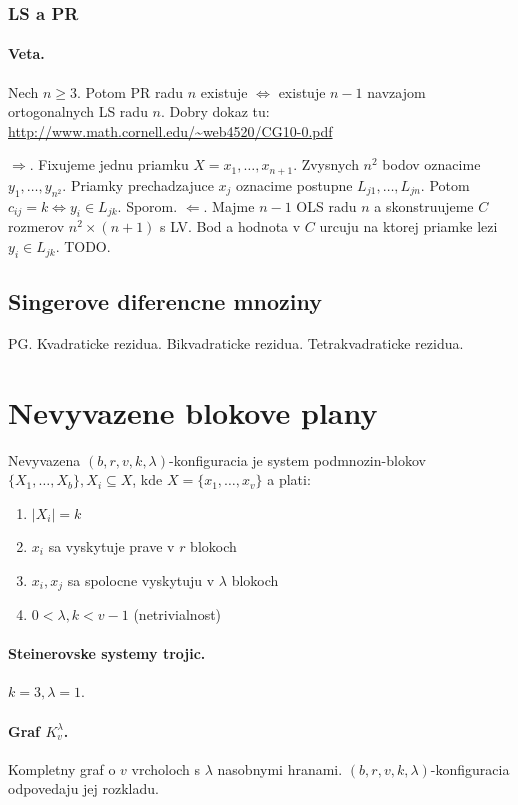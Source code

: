\documentclass[10pt,a4paper]{article}
\begin{document}
\subsubsection{LS a PR}
\paragraph{Veta.}
Nech $n \geq 3$. Potom PR radu $n$ existuje $\Leftrightarrow$ existuje $n-1$ navzajom ortogonalnych LS radu $n$.
Dobry dokaz tu: \url{http://www.math.cornell.edu/~web4520/CG10-0.pdf}

$\Rightarrow$. Fixujeme jednu priamku $X={x_1, \ldots, x_{n+1}}$. Zvysnych $n^2$ bodov oznacime $y_1,\ldots,y_{n^2}$. Priamky prechadzajuce $x_j$ oznacime postupne $L_{j1},\ldots,L_{jn}$. Potom $c_{ij}=k \Leftrightarrow y_i \in L_{jk}$. Sporom. 
$\Leftarrow$. Majme $n-1$ OLS radu $n$ a skonstruujeme $C$ rozmerov $n^2 \times (n+1)$ s LV. Bod a hodnota v $C$ urcuju na ktorej priamke lezi $y_i \in L_{jk}$. 
TODO. 

\subsection{Singerove diferencne mnoziny}
PG. Kvadraticke rezidua. Bikvadraticke rezidua. Tetrakvadraticke rezidua.


\section{Nevyvazene blokove plany} 
Nevyvazena $(b,r,v,k,\lambda)$-konfiguracia je system podmnozin-blokov $\{X_1, \ldots, X_b\}, X_i \subseteq X$, kde $X = \{x_1,\ldots, x_v\}$ a plati:
\begin{enumerate}
\item $|X_i|=k$
\item $x_i$ sa vyskytuje prave v $r$ blokoch 
\item $x_i, x_j$ sa spolocne vyskytuju v $\lambda$ blokoch 
\item $0 < \lambda, k < v-1$ (netrivialnost)
\end{enumerate}

\paragraph{Steinerovske systemy trojic.}
$k=3, \lambda=1$. 
\paragraph{Graf $K_v^\lambda$.}
Kompletny graf o $v$ vrcholoch s $\lambda$ nasobnymi hranami. $(b,r,v,k,\lambda)$-konfiguracia odpovedaju jej rozkladu. 
\end{document}
